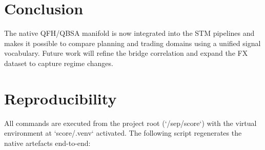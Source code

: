 \documentclass[11pt]{article}
\begin{document}
\section{Conclusion}
The native QFH/QBSA manifold is now integrated into the STM pipelines and makes it possible to compare planning and trading domains using a unified signal vocabulary. Future work will refine the bridge correlation and expand the FX dataset to capture regime changes.

\appendix
\section{Reproducibility}
All commands are executed from the project root (`/sep/score`) with the virtual environment at `score/.venv` activated.
The following script regenerates the native artefacts end-to-end:
\end{document}
